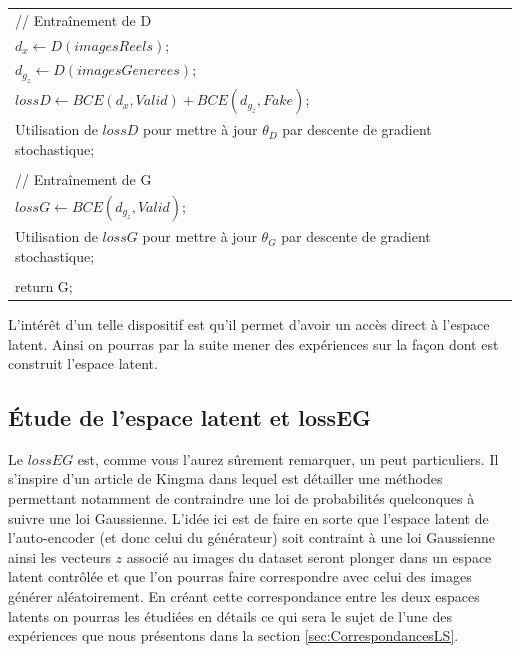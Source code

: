 \documentclass[11pt,francais]{article}
\begin{document}
\begin{table}[hb]
\begin{tabular}{l}
  \hspace{1cm}// Entraînement de D\tabularnewline
  \hspace{1cm}\(d_x \leftarrow D(imagesReels)\);\tabularnewline
  \hspace{1cm}\(d_{g_z} \leftarrow D(imagesGenerees)\);\tabularnewline
  \hspace{1cm}\(lossD \leftarrow BCE(d_x,Valid) + BCE(d_{g_z},Fake)\);\tabularnewline
  \hspace{1cm}Utilisation de \(lossD\) pour mettre à jour \(\theta_D\) par descente de gradient stochastique;\tabularnewline
  \tabularnewline
  
  \hspace{1cm}// Entraînement de G\tabularnewline
  \hspace{1cm}\(lossG\leftarrow BCE(d_{g_z},Valid)\);\tabularnewline
  \hspace{1cm}Utilisation de \(lossG\) pour mettre à jour \(\theta_G\) par descente de gradient stochastique;\tabularnewline
  \tabularnewline
  
  return G;\tabularnewline
  \hline
  \end{tabular}
  \label{tab:tab2}
\end{table}

L'intérêt d'un telle dispositif est qu'il permet d'avoir un accès direct à l'espace latent. Ainsi on pourras par la suite mener des expériences sur la façon dont est construit l'espace latent.

\subsection{Étude de l'espace latent et lossEG}
\label{sec:LatentSpace}
Le \(lossEG\) est, comme vous l'aurez sûrement remarquer, un peut particuliers. Il s'inspire d'un article de Kingma \cite{kingma2013auto} dans lequel est détailler une méthodes permettant notamment de contraindre une loi de probabilités quelconques à suivre une loi Gaussienne.
L'idée ici est de faire en sorte que l'espace latent de l'auto-encoder (et donc celui du générateur) soit contraint à une loi Gaussienne ainsi les vecteurs \(z\) associé au images du dataset seront plonger dans un espace latent contrôlée et que l'on pourras faire correspondre avec celui des images générer aléatoirement.  En créant cette correspondance entre les deux espaces latents on pourras les étudiées en détails ce qui sera le sujet de l'une des expériences que nous présentons dans la section \ref{sec:CorrespondancesLS}.
\end{document}
